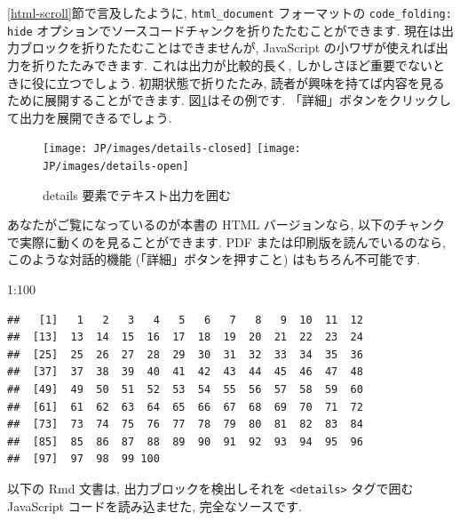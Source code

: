 \documentclass[
  11pt,
  lualatex,ja=standard,jafont=noto]{bxjsreport}
\newenvironment{Shaded}{\begin{snugshade}}{\end{snugshade}}
\newcommand{\DecValTok}[1]{\textcolor[rgb]{0.00,0.00,0.81}{#1}}
\newcommand{\SpecialCharTok}[1]{\textcolor[rgb]{0.00,0.00,0.00}{#1}}
\begin{document}
\ref{html-scroll}節で言及したように, \texttt{html\_document} フォーマットの \texttt{code\_folding: hide} オプションでソースコードチャンクを折りたたむことができます. 現在は出力ブロックを折りたたむことはできませんが, JavaScript の小ワザが使えれば出力を折りたたみできます. これは出力が比較的長く, しかしさほど重要でないときに役に立つでしょう. 初期状態で折りたたみ, 読者が興味を持てば内容を見るために展開することができます. 図\ref{fig:details-tag}はその例です. 「詳細」ボタンをクリックして出力を展開できるでしょう.

\begin{figure}

{\centering \texttt{[image: JP/images/details-closed]} \texttt{[image: JP/images/details-open]} 

}

\caption{details 要素でテキスト出力を囲む}\label{fig:details-tag}
\end{figure}

あなたがご覧になっているのが本書の HTML バージョンなら, 以下のチャンクで実際に動くのを見ることができます. PDF または印刷版を読んでいるのなら, このような対話的機能 (「詳細」ボタンを押すこと) はもちろん不可能です.

\begin{Shaded}
\begin{Highlighting}[numbers=left,,]
\DecValTok{1}\SpecialCharTok{:}\DecValTok{100}
\end{Highlighting}
\end{Shaded}

\begin{verbatim}
##   [1]   1   2   3   4   5   6   7   8   9  10  11  12
##  [13]  13  14  15  16  17  18  19  20  21  22  23  24
##  [25]  25  26  27  28  29  30  31  32  33  34  35  36
##  [37]  37  38  39  40  41  42  43  44  45  46  47  48
##  [49]  49  50  51  52  53  54  55  56  57  58  59  60
##  [61]  61  62  63  64  65  66  67  68  69  70  71  72
##  [73]  73  74  75  76  77  78  79  80  81  82  83  84
##  [85]  85  86  87  88  89  90  91  92  93  94  95  96
##  [97]  97  98  99 100
\end{verbatim}

以下の Rmd 文書は, 出力ブロックを検出しそれを \texttt{\textless{}details\textgreater{}} タグで囲む JavaScript コードを読み込ませた, 完全なソースです.
\end{document}
